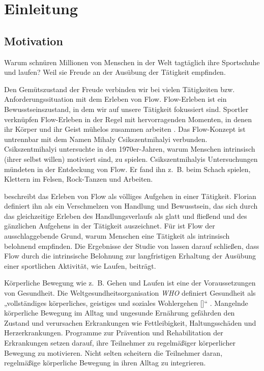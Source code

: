 \chapter{Einleitung} %
\label{cha:einleitung}

\section{Motivation} %
\label{sec:motivation}

Warum schnüren Millionen von Menschen in der Welt tagtäglich ihre Sportschuhe und laufen? Weil sie Freude an der Ausübung der Tätigkeit empfinden.

Den Gemütszustand der Freude verbinden wir bei vielen Tätigkeiten bzw. Anforderungssituation mit dem Erleben von Flow. Flow-Erleben ist ein Bewusstseinszustand, in dem wir auf unsere Tätigkeit fokussiert sind. Sportler verknüpfen Flow-Erleben in der Regel mit hervorragenden Momenten, in denen ihr Körper und ihr Geist mühelos zusammen arbeiten \citep[S.~5]{Jackson1999}. Das Flow-Konzept ist untrennbar mit dem Namen Mihaly Csikszentmihalyi verbunden. Csikszentmihalyi untersuchte in den 1970er-Jahren, warum Menschen intrinsisch (ihrer selbst willen) motiviert sind, zu spielen. Csikszentmihalyis Untersuchungen mündeten in der Entdeckung von Flow. Er fand ihn z.~B. beim Schach spielen, Klettern im Felsen, Rock-Tanzen und Arbeiten.

\citet[][S.~58~f.]{Csikszentmihalyi2010} beschreibt das Erleben von Flow als völliges Aufgehen in einer Tätigkeit. Florian \citet[][S.~13]{Henk2014} definiert ihn als ein Verschmelzen von Handlung und Bewusstsein, das sich durch das gleichzeitige Erleben des Handlungsverlaufs als glatt und fließend und des gänzlichen Aufgehens in der Tätigkeit auszeichnet. Für \citet[][S.~602]{Csikszentmihalyi2005} ist Flow der ausschlaggebende Grund, warum Menschen eine Tätigkeit als intrinsisch belohnend empfinden. Die Ergebnisse der Studie von \citet[][S.~174]{Schuler2009} lassen darauf schließen, dass Flow durch die intrinsische Belohnung zur langfristigen Erhaltung der Ausübung einer sportlichen Aktivität, wie Laufen, beiträgt.

Körperliche Bewegung wie z.~B. Gehen und Laufen ist eine der Voraussetzungen von Gesundheit. Die Weltgesundheitsorganisation \emph{\ac{WHO}} definiert Gesundheit als „vollständiges körperliches, geistiges und soziales Wohlergehen [\textellipsis]“ \citep[S.~100]{WorldHealthOrganization1948}. Mangelnde körperliche Bewegung im Alltag und ungesunde Ernährung gefährden den Zustand und verursachen Erkrankungen wie Fettleibigkeit, Haltungsschäden und Herzerkrankungen. Programme zur Prävention und Rehabilitation der Erkrankungen setzen darauf, ihre Teilnehmer zu regelmäßiger körperlicher Bewegung zu motivieren. Nicht selten scheitern die Teilnehmer daran, regelmäßige körperliche Bewegung in ihren Alltag zu integrieren.


